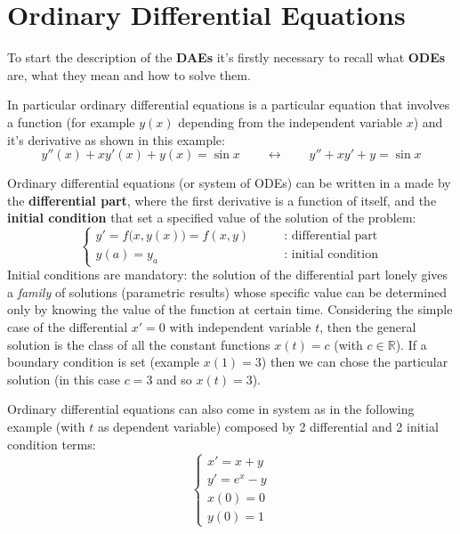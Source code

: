 \chapter{Ordinary Differential Equations}
	To start the description of the \textbf{DAEs} it's firstly necessary to recall what  \textbf{ODEs} are, what they mean and how to solve them.
	
	In particular ordinary differential equations is a particular equation that involves a function (for example $y(x)$ depending from the independent variable $x$) and it's derivative as shown in this example:
	\[ y''(x) + x y'(x) + y(x) = \sin x \qquad \leftrightarrow \qquad y'' + xy' + y = \sin x \]
	
	Ordinary differential equations (or system of ODEs) can be written in a  made by the \textbf{differential part}, where the first derivative is a function of itself, and the \textbf{initial condition} that set a specified value of the solution of the problem:
	\begin{equation}
	\begin{cases}
		y' = f\big(x,y(x)\big) = f(x,y) \qquad & \text{: differential part} \\
		y(a) = y_a & \text{: initial condition}
	\end{cases}
	\end{equation}
	Initial conditions are mandatory: the solution of the differential part lonely gives a \textit{family} of solutions (parametric results) whose specific value can be determined only by knowing the value of the function at certain time. Considering the simple case of the differential $x' = 0$ with independent variable $t$, then the general solution is the class of all the constant functions $x(t) = c$ (with $c\in \mathds R$). If a boundary condition is set (example $x(1) = 3$) then we can chose the particular solution (in this case $c = 3$ and so $x(t) = 3$).
	
	Ordinary differential equations can also come in system as in the following example (with $t$ as dependent variable) composed by 2 differential and 2 initial condition terms:
	\[\begin{cases}
		x' = x + y \\ y' = e^x-y \\ x(0) = 0 \\ y(0) = 1
	\end{cases}\]
	
